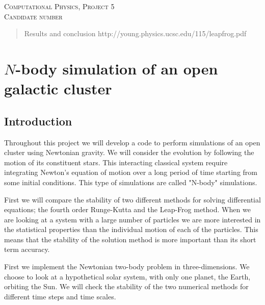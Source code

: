 \documentclass[a4paper,12pt, english]{article}
\begin{document}
\begin{titlepage}
\begin{center}
\textsc{\Large Computational Physics, Project 5}\\[0.5cm]
\textsc{Candidate number}\\[0.5cm]

\end{center}
\end{titlepage}

\begin{abstract}
Results and conclusion
http://young.physics.ucsc.edu/115/leapfrog.pdf
\end{abstract}

\section*{$N$-body simulation of an open galactic cluster}

\subsection*{Introduction}

Throughout this project we will develop a code to perform simulations of an open cluster using Newtonian gravity. We will consider the evolution by following the motion of its constituent stars. This interacting classical system require integrating Newton's equation of motion over a long period of time starting from some initial conditions. This type of simulations are called "N-body" simulations.

First we will compare the stability of two different methods for solving differential equations; the fourth order Runge-Kutta and the Leap-Frog method. When we are looking at a system with a large number of particles we are more interested in the statistical properties than the individual motion of each of the particles. This means that the stability of the solution method is more important than its short term accuracy.

First we implement the Newtonian two-body problem in three-dimensions. We choose to look at a hypothetical solar system, with only one planet, the Earth, orbiting the Sun. We will check the stability of the two numerical methods for different time steps and time scales.
\end{document}
